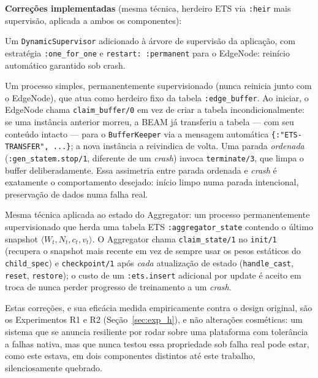 \documentclass[conference,a4paper]{IEEEtran}
\begin{document}
\textbf{Correções implementadas} (mesma técnica, herdeiro ETS via
\texttt{:heir} mais supervisão, aplicada a ambos os componentes):

\begin{description}[leftmargin=*,noitemsep]
  \item[\texttt{AFL.EdgeNodeSupervisor}] Um \texttt{DynamicSupervisor}
    adicionado à árvore de supervisão da aplicação, com estratégia
    \texttt{:one\_for\_one} e \texttt{restart: :permanent} para o EdgeNode:
    reinício automático garantido sob crash.
  \item[\texttt{AFL.BufferKeeper}] Um processo simples, permanentemente
    supervisionado (nunca reinicia junto com o EdgeNode), que atua como
    herdeiro fixo da tabela \texttt{:edge\_buffer}. Ao iniciar, o EdgeNode
    chama \texttt{claim\_buffer/0} em vez de criar a tabela
    incondicionalmente: se uma instância anterior morreu, a BEAM já
    transferiu a tabela --- com seu conteúdo intacto --- para o
    \texttt{BufferKeeper} via a mensagem automática
    \texttt{\{:"ETS-TRANSFER", ...\}}; a nova instância a reivindica de
    volta. Uma parada \emph{ordenada} (\texttt{:gen\_statem.stop/1},
    diferente de um \textit{crash}) invoca \texttt{terminate/3}, que limpa
    o buffer deliberadamente. Essa assimetria entre parada ordenada e
    \textit{crash} é exatamente o comportamento desejado: início limpo
    numa parada intencional, preservação de dados numa falha real.
  \item[\texttt{AFL.ModelKeeper}] Mesma técnica aplicada ao estado do
    Aggregator: um processo permanentemente supervisionado que herda uma
    tabela ETS \texttt{:aggregator\_state} contendo o último snapshot
    $\langle W_t, N_t, c_t, v_t\rangle$. O Aggregator chama
    \texttt{claim\_state/1} no \texttt{init/1} (recupera o snapshot mais
    recente em vez de sempre usar os pesos estáticos do
    \texttt{child\_spec}) e \texttt{checkpoint/1} após \emph{cada}
    atualização de estado (\texttt{handle\_cast}, \texttt{reset},
    \texttt{restore}); o custo de um \texttt{:ets.insert} adicional por
    update é aceito em troca de nunca perder progresso de treinamento a um
    \textit{crash}.
\end{description}

Estas correções, e sua eficácia medida empiricamente contra o design
original, são os Experimentos R1 e R2 (Seção~\ref{sec:exp_h}), e não
alterações cosméticas: um sistema que se anuncia resiliente por rodar
sobre uma plataforma com tolerância a falhas nativa, mas que nunca testou
essa propriedade sob falha real pode estar, como este estava, em dois
componentes distintos até este trabalho, silenciosamente quebrado.
\end{document}
